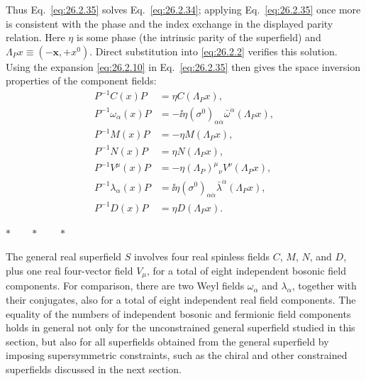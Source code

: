 Thus Eq.~\eqref{eq:26.2.35} solves Eq.~\eqref{eq:26.2.34}; applying
Eq.~\eqref{eq:26.2.35} once more is consistent with the phase and the
index exchange in the displayed parity relation.
Here $\eta$ is some phase (the intrinsic parity of the superfield) and
$\Lambda_Px\equiv(-\mathbf{x},+x^0)$.  Direct substitution into
\eqref{eq:26.2.2} verifies this solution. Using the expansion
\eqref{eq:26.2.10} in
Eq.~\eqref{eq:26.2.35} then gives the space inversion properties of the
component fields:
\begin{equation}
  \begin{aligned}
  P^{-1}C(x)P&=\eta C(\Lambda_Px),\\
  P^{-1}\omega_\alpha(x)P
    &=-\ii\eta(\sigma^0)_{\alpha\dot\alpha}
      \bar\omega^{\dot\alpha}(\Lambda_Px),\\
  P^{-1}M(x)P&=-\eta M(\Lambda_Px),\\
  P^{-1}N(x)P&=\eta N(\Lambda_Px),\\
  P^{-1}V^\mu(x)P&=-\eta(\Lambda_P)^\mu{}_\nu V^\nu(\Lambda_Px),\\
  P^{-1}\lambda_\alpha(x)P
    &=\ii\eta(\sigma^0)_{\alpha\dot\alpha}
      \bar\lambda^{\dot\alpha}(\Lambda_Px),\\
  P^{-1}D(x)P&=\eta D(\Lambda_Px).
  \end{aligned}
  \tag{26.2.36}\label{eq:26.2.36}
\end{equation}

\begin{center}
\(\ast\qquad\ast\qquad\ast\)
\end{center}

The general real superfield $S$ involves four real spinless fields $C$, $M$,
$N$, and $D$, plus one real four-vector field $V_\mu$, for a total of eight
independent bosonic field components. For comparison, there are two
Weyl fields \(\omega_\alpha\) and \(\lambda_\alpha\), together with their
conjugates, also for a total of eight independent real field components. The
equality of the numbers of
independent bosonic and fermionic field components holds in general not only
for the unconstrained general superfield studied in this section, but also for
all superfields obtained from the general superfield by imposing
supersymmetric constraints, such as the chiral and other constrained
superfields discussed in the next section.

